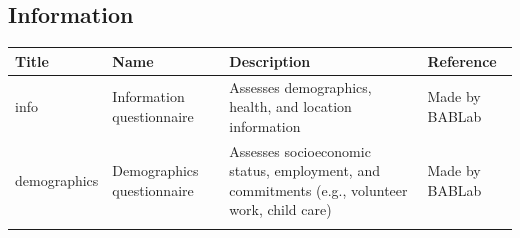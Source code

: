 \documentclass[]{book}
\begin{document}
\hypertarget{information-1}{%
\subsection{Information}\label{information-1}}

\begin{longtable}[]{@{}llll@{}}
\toprule
\begin{minipage}[b]{0.22\columnwidth}\raggedright
Title\strut
\end{minipage} & \begin{minipage}[b]{0.27\columnwidth}\raggedright
Name\strut
\end{minipage} & \begin{minipage}[b]{0.22\columnwidth}\raggedright
Description\strut
\end{minipage} & \begin{minipage}[b]{0.18\columnwidth}\raggedright
Reference\strut
\end{minipage}\tabularnewline
\midrule
\endhead
\begin{minipage}[t]{0.22\columnwidth}\raggedright
info\strut
\end{minipage} & \begin{minipage}[t]{0.27\columnwidth}\raggedright
Information questionnaire\strut
\end{minipage} & \begin{minipage}[t]{0.22\columnwidth}\raggedright
Assesses demographics, health, and location information\strut
\end{minipage} & \begin{minipage}[t]{0.18\columnwidth}\raggedright
Made by BABLab\strut
\end{minipage}\tabularnewline
\begin{minipage}[t]{0.22\columnwidth}\raggedright
demographics\strut
\end{minipage} & \begin{minipage}[t]{0.27\columnwidth}\raggedright
Demographics questionnaire\strut
\end{minipage} & \begin{minipage}[t]{0.22\columnwidth}\raggedright
Assesses socioeconomic status, employment, and commitments (e.g., volunteer work, child care)\strut
\end{minipage} & \begin{minipage}[t]{0.18\columnwidth}\raggedright
Made by BABLab\strut
\end{minipage}\tabularnewline
\begin{minipage}[t]{0.22\columnwidth}\raggedright

\end{minipage}
\end{longtable}
\end{document}
